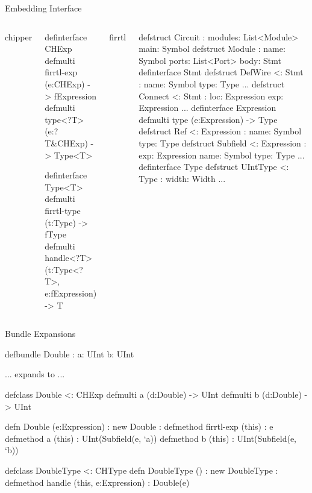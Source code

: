 \documentclass[xcolor=pdflatex,dvipsnames,table]{beamer}
\begin{document}
\begin{frame}[fragile]{Embedding Interface}
\begin{columns}


chipper
{
\begin{scala}
definterface CHExp
defmulti firrtl-exp (e:CHExp) -> fExpression
defmulti type<?T> (e:?T&CHExp) -> Type<T>

definterface Type<T>
defmulti firrtl-type (t:Type) -> fType
defmulti handle<?T> (t:Type<?T>, e:fExpression) -> T
\end{scala}
}


firrtl
{
\begin{scala}
defstruct Circuit :
   modules: List<Module>
   main: Symbol
defstruct Module :
   name: Symbol
   ports: List<Port>
   body: Stmt
definterface Stmt
defstruct DefWire <: Stmt :
   name: Symbol
   type: Type
...
defstruct Connect <: Stmt :
   loc: Expression
   exp: Expression
...
definterface Expression
defmulti type (e:Expression) -> Type
defstruct Ref <: Expression :
   name: Symbol
   type: Type
defstruct Subfield <: Expression :
   exp: Expression
   name: Symbol
   type: Type
...
definterface Type
defstruct UIntType <: Type :
   width: Width
...
\end{scala}
}
\end{columns}

\end{frame}

\begin{frame}[fragile]{Bundle Expansions}

\begin{stanza}
defbundle Double :
   a: UInt
   b: UInt
\end{stanza}

... expands to ...

{
\begin{stanza}
defclass Double <: CHExp
defmulti a (d:Double) -> UInt
defmulti b (d:Double) -> UInt

defn Double (e:Expression) :
   new Double :
      defmethod firrtl-exp (this) : e
      defmethod a (this) :
         UInt(Subfield(e, `a))
      defmethod b (this) :
         UInt(Subfield(e, `b))

defclass DoubleType <: CHType
defn DoubleType () :
   new DoubleType :
      defmethod handle (this, e:Expression) :
         Double(e)
\end{stanza}
}
\end{frame}
\end{document}
